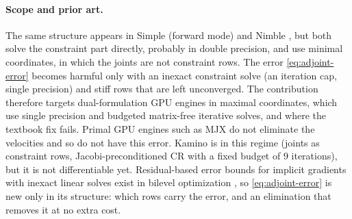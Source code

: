 \paragraph{Scope and prior art.}
The same structure appears in Simple \citep{lelidec2024highly} (forward
mode) and Nimble \citep{werling2021fast}, but both solve the constraint
part directly, probably in double precision, and use minimal coordinates,
in which the joints are not constraint rows. The error
\eqref{eq:adjoint-error} becomes harmful only with an inexact constraint
solve (an iteration cap, single precision) and stiff rows that are left
unconverged. The contribution therefore targets dual-formulation GPU
engines in maximal coordinates, which use single precision and budgeted
matrix-free iterative solves, and where the textbook fix fails. Primal
GPU engines such as MJX do not eliminate the velocities and so do not
have this error. Kamino
\citep{tsounis2026kamino} is in this regime (joints as constraint rows,
Jacobi-preconditioned CR with a fixed budget of $9$ iterations), but it is
not differentiable yet. Residual-based error bounds for implicit
gradients with inexact linear solves exist in bilevel optimization
\citep{ehrhardt2023analyzing}, so \eqref{eq:adjoint-error} is new only in
its structure: which rows carry the error, and an elimination that removes
it at no extra cost.

